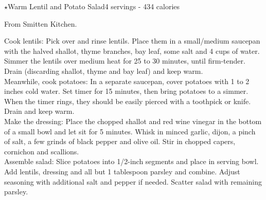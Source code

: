 \begin{recipe}{\texorpdfstring{$\star$}{str}Warm Lentil and Potato Salad}{4 servings - 434 calories}{}

\freeform From Smitten Kitchen.


Cook lentils: Pick over and rinse lentils. Place them in a small/medium saucepan with the halved shallot, thyme branches, bay leaf, some salt and 4 cups of water. Simmer the lentils over medium heat for 25 to 30 minutes, until firm-tender. Drain (discarding shallot, thyme and bay leaf) and keep warm.\\

Meanwhile, cook potatoes: In a separate saucepan, cover potatoes with 1 to 2 inches cold water. Set timer for 15 minutes, then bring potatoes to a simmer. When the timer rings, they should be easily pierced with a toothpick or knife. Drain and keep warm.\\

Make the dressing: Place the chopped shallot and red wine vinegar in the bottom of a small bowl and let sit for 5 minutes. Whisk in minced garlic, dijon, a pinch of salt, a few grinds of black pepper and olive oil. Stir in chopped capers, cornichon and scallions.\\

Assemble salad: Slice potatoes into 1/2-inch segments and place in serving bowl. Add lentils, dressing and all but 1 tablespoon parsley and combine. Adjust seasoning with additional salt and pepper if needed. Scatter salad with remaining parsley.

\end{recipe}